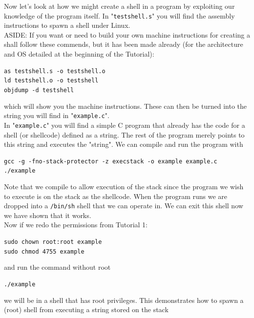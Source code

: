 \documentclass{article}
\begin{document}
\noindent Now let's look at how we might create a shell in a program by exploiting
our knowledge of the program itself.
In "\lstinline{testshell.s}" you will find the assembly instructions to spawn a shell
under Linux.\\


\noindent ASIDE: If you want or need to build your own machine instructions for
creating a shall follow these commends, but it has been made already (for
the architecture and OS detailed at the beginning of the Tutorial):
\begin{center}
    \lstinline{as testshell.s -o testshell.o}\\
    \lstinline{ld testshell.o -o testshell}\\
    \lstinline{objdump -d testshell}
\end{center}
\noindent which will show you the machine instructions. These can then be turned into the string you will find in "\lstinline{example.c}".\\

\noindent In "\lstinline{example.c}" you will find a simple C program that already has the
code for a shell (or shellcode) defined as a string. The rest of the program
merely points to this string and executes the "string". We can compile and
run the program with
\begin{center}
    \lstinline{gcc -g -fno-stack-protector -z execstack -o example example.c}\\
    \lstinline{./example}
\end{center}
Note that we compile to allow execution of the stack since the program we wish to execute is on the stack as the shellcode.
When the program runs we are dropped into a \lstinline{/bin/sh} shell that we can
operate in. We can exit this shell now we have shown that it works.\\

\noindent Now if we redo the permissions from Tutorial 1:
\begin{center}
    \lstinline{sudo chown root:root example}\\
    \lstinline{sudo chmod 4755 example}
\end{center}
\noindent and run the command without root
\begin{center}
    \lstinline{./example}
\end{center}
\noindent we will be in a shell that has root privileges. This demonstrates how to spawn a (root) shell from executing a string
stored on the stack
\end{document}
